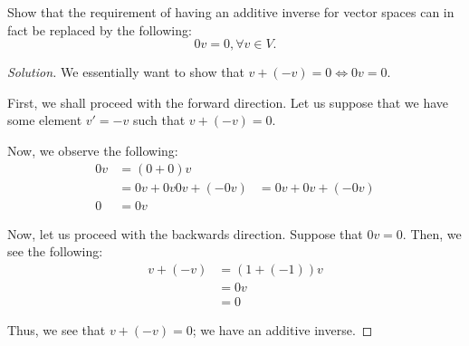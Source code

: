 \documentclass[openany]{book}
\newenvironment{solution}{\begin{proof}[Solution]}{\end{proof}}
\begin{document}
	\begin{hw}
		Show that the requirement of having an additive inverse for vector spaces can in fact be replaced by the following:
		\begin{equation*}
			0v = 0, \forall v \in V.
		\end{equation*}
	\end{hw}
	\begin{solution}
		We essentially want to show that $v + (-v) = 0 \iff 0v = 0$.
		
		First, we shall proceed with the forward direction. Let us suppose that we have some element $v' = -v$ such that $v + (-v) = 0$.
		
		Now, we observe the following:
		\begin{align*}
			0v &= (0+0)v \\
			&= 0v + 0v
			0v + (-0v) &= 0v + 0v + (-0v) \\
			0 &= 0v
		\end{align*}
	
		Now, let us proceed with the backwards direction. Suppose that $0v = 0$. Then, we see the following:
		\begin{align*}
			v + (-v) &= (1+ (-1))v \\
			&= 0v \\
			&= 0
		\end{align*}
	
		Thus, we see that $v + (-v) = 0$; we have an additive inverse. 
	\end{solution}
\end{document}
